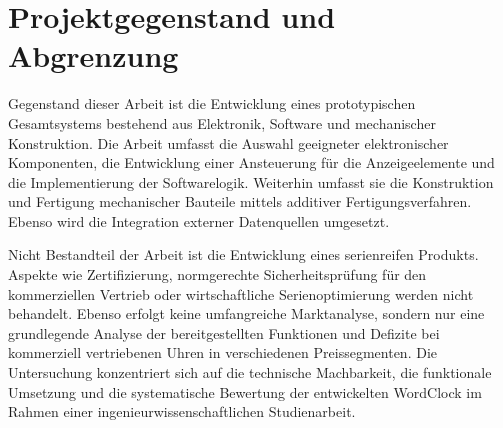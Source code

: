 \section{Projektgegenstand und Abgrenzung}
Gegenstand dieser Arbeit ist die Entwicklung eines prototypischen Gesamtsystems bestehend aus Elektronik, Software und mechanischer Konstruktion. 
Die Arbeit umfasst die Auswahl geeigneter elektronischer Komponenten, die Entwicklung einer Ansteuerung für die Anzeigeelemente und die Implementierung der Softwarelogik.
Weiterhin umfasst sie die Konstruktion und Fertigung mechanischer Bauteile mittels additiver Fertigungsverfahren. 
Ebenso wird die Integration externer Datenquellen umgesetzt. 

Nicht Bestandteil der Arbeit ist die Entwicklung eines serienreifen Produkts. 
Aspekte wie Zertifizierung, normgerechte Sicherheitsprüfung für den kommerziellen Vertrieb oder wirtschaftliche Serienoptimierung werden nicht behandelt. 
Ebenso erfolgt keine umfangreiche Marktanalyse, sondern nur eine grundlegende Analyse der bereitgestellten Funktionen und Defizite bei kommerziell vertriebenen Uhren in verschiedenen Preissegmenten.
Die Untersuchung konzentriert sich auf die technische Machbarkeit, die funktionale Umsetzung und die systematische Bewertung der entwickelten WordClock im Rahmen einer ingenieurwissenschaftlichen Studienarbeit.